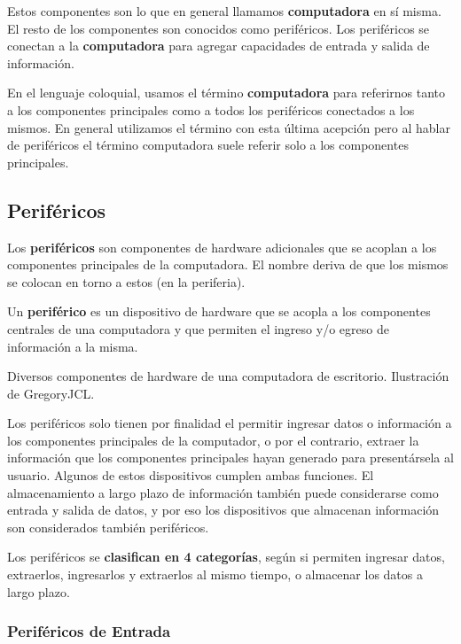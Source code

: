 Estos componentes son lo que en general llamamos \textbf{computadora} en sí misma.
El resto de los componentes son conocidos como periféricos. Los periféricos se
conectan a la \textbf{computadora} para agregar capacidades de entrada y salida
de información.\autocite[cap. 2]{gookin_2006}

En el lenguaje coloquial, usamos el término \textbf{computadora}
para referirnos tanto a los componentes principales como a todos los periféricos
conectados a los mismos. En general utilizamos el término con esta última acepción
pero al hablar de periféricos el término computadora suele referir solo a los
componentes principales.

\subsection{Periféricos}

Los \textbf{periféricos} son componentes de hardware adicionales que se acoplan
a los componentes principales de la computadora. El nombre deriva de que los
mismos se colocan en torno a estos (en la periferia).

\begin{definition}
    Un \textbf{periférico} es un dispositivo de hardware que se acopla a los
    componentes centrales de una computadora y que permiten el ingreso y/o egreso
    de información a la misma.\autocite[vid. p. 363]{laplante_2000}
\end{definition}

{Diversos componentes de hardware de una computadora de escritorio.}
{Ilustración de GregoryJCL.}

Los periféricos solo tienen por finalidad el permitir ingresar datos o
información a los componentes principales de la computador, o por el contrario,
extraer la información que los componentes principales hayan generado para
presentársela al usuario. Algunos de estos dispositivos cumplen ambas funciones.
El almacenamiento a largo plazo de información también puede considerarse como
entrada y salida de datos, y por eso los dispositivos que almacenan información
son considerados también periféricos.

Los periféricos se \textbf{clasifican en 4 categorías}, según si permiten
ingresar datos, extraerlos, ingresarlos y extraerlos al mismo tiempo, o
almacenar los datos a largo plazo.

\subsubsection*{Periféricos de Entrada}

